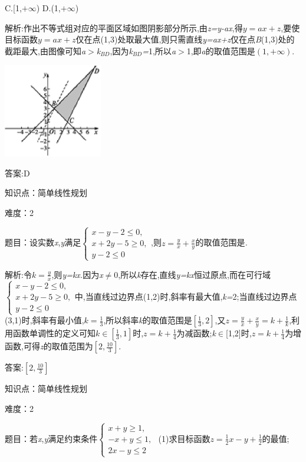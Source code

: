 \documentclass{article} %
\begin{document}
 C.[1,\textit{$+\infty$}) D.(1,\textit{$+\infty$})

 解析:作出不等式组对应的平面区域如图阴影部分所示,由\textit{z=y-ax},得$y=ax+z$,要使目标函数$y=ax+z$仅在点(1,3)处取最大值,则只需直线\textit{y=ax+z}仅在点\textit{B}(1,3)处的截距最大,由图像可知\textit{a$>$k${}_{BD}$},因为\textit{k${}_{BD}$=}1,所以\textit{a$>$}1,即\textit{a}的取值范围是$(1,+\infty)$.

 \includegraphics*[width=1.70in, height=1.61in, keepaspectratio=false]{image1657}

 答案:D

知识点：简单线性规划

难度：2

题目：设实数\textit{x},\textit{y}满足$
\begin{cases}
x-y-2 \le 0,\\
x+ 2y-5 \ge 0,\\
y-2 \le 0
\end{cases}$,则$z=\frac{y}{x}+\frac{x}{y}$的取值范围是\textit{\underbar{　　　　　　}.~}

 解析:令$k=\frac{y}{x}$,则\textit{y=kx.}因为\textit{x}$\mathrm{\neq}$0,所以\textit{k}存在,直线\textit{y=kx}恒过原点,而在可行域$
\begin{cases}
x-y-2 \le 0,\\
x+2y -5 \ge 0,\\
y-2 \le 0
\end{cases}$中,当直线过边界点(1,2)时,斜率有最大值,\textit{k=}2;当直线过边界点(3,1)时,斜率有最小值,$k=\frac{1}{3}$,所以斜率\textit{k}的取值范围是$[\frac{1}{3},2]$,又$z=\frac{y}{x}+\frac{x}{y}=k+\frac{1}{k}$,利用函数单调性的定义可知$k \in [\frac{1}{3},1]$时,$z=k+\frac{1}{4}$为减函数;\textit{k}$\mathrm{\in}$[1,2]时,$z=k+\frac{1}{4}$为增函数,可得\textit{z}的取值范围为$[2,\frac{10}{3}]$.

 答案:$[2,\frac{10}{3}]$

知识点：简单线性规划

难度：2

题目：若\textit{x},\textit{y}满足约束条件$
\begin{cases}
x+y \ge 1,\\
-x +y \le1,\\
2x-y \le 2
\end{cases}
$
 (1)求目标函数$z=\frac{1}{2}x-y+\frac{1}{2}$的最值;
\end{document}

